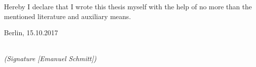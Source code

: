 \newpage

\thispagestyle{empty}

\begin{large}

\vspace*{6cm}

\noindent
Hereby I declare that I wrote this thesis myself with the help of no more than the mentioned literature and auxiliary means.
\vspace{2cm}

\noindent
Berlin, 15.10.2017

\vspace{3cm}

\hspace*{7cm}%
\dotfill\\
\hspace*{8.5cm}%
\textit{(Signature [Emanuel Schmitt])}

\end{large}
